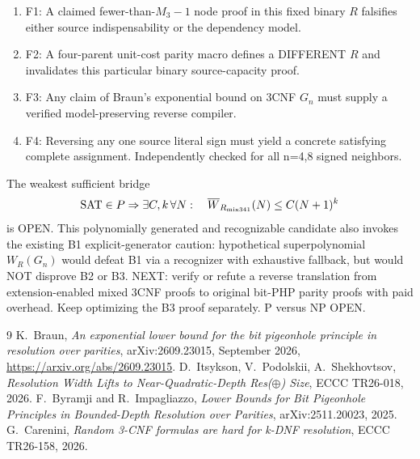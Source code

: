\documentclass[11pt]{article}
\begin{document}
\begin{enumerate}
\item[] F1: A claimed fewer-than-$M_3-1$ node proof in this fixed binary $R$ falsifies either source indispensability or the dependency model.
\item[] F2: A four-parent unit-cost parity macro defines a DIFFERENT $R$ and invalidates this particular binary source-capacity proof.
\item[] F3: Any claim of Braun's exponential bound on 3CNF $G_n$ must supply a verified model-preserving reverse compiler.
\item[] F4: Reversing any one source literal sign must yield a concrete satisfying complete assignment. Independently checked for all n=4,8 signed neighbors.
\end{enumerate}
The weakest sufficient bridge
\[
\mathrm{SAT}\in P \Rightarrow \exists C,k\,\forall N:\quad\overline W_{R_{\rm mix341}}(N)\le C(N+1)^k
\]
is OPEN. This polynomially generated and recognizable candidate also invokes the existing B1 explicit-generator caution: hypothetical superpolynomial $W_R(G_n)$ would defeat B1 via a recognizer with exhaustive fallback, but would NOT disprove B2 or B3. NEXT: verify or refute a reverse translation from extension-enabled mixed 3CNF proofs to original bit-PHP parity proofs with paid overhead. Keep optimizing the B3 proof separately. P versus NP OPEN.

\begin{thebibliography}{9}
 K.~Braun, \emph{An exponential lower bound for the bit pigeonhole principle in resolution over parities}, arXiv:2609.23015, September 2026, \url{https://arxiv.org/abs/2609.23015}.
 D.~Itsykson, V.~Podolskii, A.~Shekhovtsov, \emph{Resolution Width Lifts to Near-Quadratic-Depth Res($\oplus$) Size}, ECCC TR26-018, 2026.
 F.~Byramji and R.~Impagliazzo, \emph{Lower Bounds for Bit Pigeonhole Principles in Bounded-Depth Resolution over Parities}, arXiv:2511.20023, 2025.
 G.~Carenini, \emph{Random 3-CNF formulas are hard for k-DNF resolution}, ECCC TR26-158, 2026.
\end{thebibliography}
\end{document}
